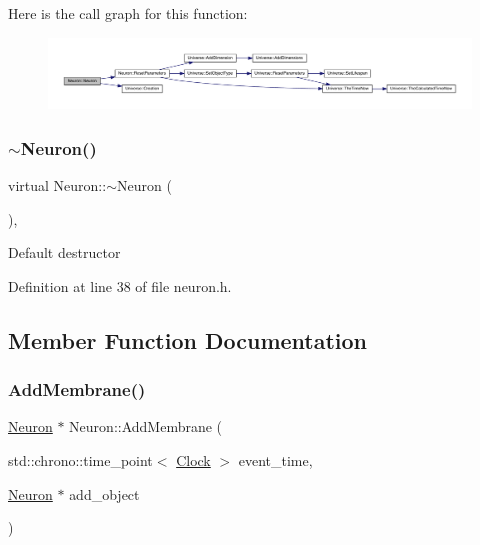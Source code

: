 Here is the call graph for this function\+:
\nopagebreak
\begin{figure}[H]
\begin{center}
\leavevmode
\includegraphics[width=350pt]{class_neuron_a6839febd20fb8f776151e00142411a56_cgraph}
\end{center}
\end{figure}
\mbox{\label{class_neuron_aecd41febe74ef417230cd74af0c8b801}} 
\subsubsection{\texorpdfstring{$\sim$\+Neuron()}{~Neuron()}}
{\footnotesize\ttfamily virtual Neuron\+::$\sim$\+Neuron (\begin{DoxyParamCaption}{ }\end{DoxyParamCaption})\hspace{0.3cm}{\ttfamily [inline]}, {\ttfamily [virtual]}}

Default destructor 

Definition at line 38 of file neuron.\+h.



\subsection{Member Function Documentation}
\mbox{\label{class_neuron_a99d4b64f128e2bfbffec3c5d476a2ca3}} 
\subsubsection{\texorpdfstring{Add\+Membrane()}{AddMembrane()}}
{\footnotesize\ttfamily \hyperlink{class_neuron}{Neuron} $\ast$ Neuron\+::\+Add\+Membrane (\begin{DoxyParamCaption}\item[{std\+::chrono\+::time\+\_\+point$<$ \hyperlink{universe_8h_a0ef8d951d1ca5ab3cfaf7ab4c7a6fd80}{Clock} $>$}]{event\+\_\+time,  }\item[{\hyperlink{class_neuron}{Neuron} $\ast$}]{add\+\_\+object }\end{DoxyParamCaption})}



